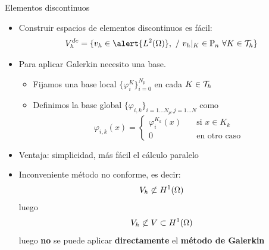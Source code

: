 \documentclass[9pt,leqno]{beamer}
\newcommand{\Nt}{N}
\newcommand{\Np}{{N_p}}
\begin{document}
\begin{frame}{Elementos discontinuos}
  \begin{itemize}
  \item Construir espacios de elementos discontinuos es fácil:
  $$
  V_h^{dc} = \{ \vh\in \alert{L^2(\Omega)},\ /\ \vh|_K \in
  \mathbb{P}_n\ \forall K\in\Th\}
  $$
\item
  Para aplicar Galerkin necesito una base.
  \begin{itemize}
  \item Fijamos una base local $\{\varphi_i^K\}_{i=0}^{\Np}$ en cada
    $K\in {\cal T}_h$
  \item Definimos la base global
    $\{\varphi_{i,k}\}_{i=1...\Np, j=1...\Nt}$ como
    \begin{equation*}
      \varphi_{i,k}(x) = \left\{
        \begin{aligned}
          \varphi_i^{K_k} (x) &\quad \text{si } x\in K_k \\
          0 &\quad \text{en otro caso}
        \end{aligned}
      \right.
    \end{equation*}
  \end{itemize}
\item Ventaja: simplicidad, más fácil el cálculo paralelo
\item Inconveniente método no conforme, es decir:
  $$V_h\not\subset H^1(\Omega)$$
  luego
  $$
  V_h \not\subset V\subset H^1(\Omega)
  $$
 luego \textbf{no} se puede aplicar \textbf{directamente} el \textbf{método de Galerkin}
\end{itemize}
\end{frame}
\end{document}
